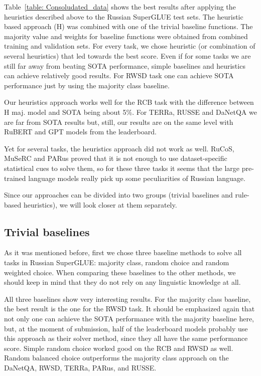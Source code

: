 \documentclass[11pt]{article}
\begin{document}
Table~\ref{table: Consoludated_data} shows the best results after applying the heuristics described above to the Russian SuperGLUE test sets.
The heuristic based approach (H) was combined with one of the trivial baseline functions. The majority value and weights for baseline functions were obtained from combined training and validation sets.
For every task, we chose heuristic (or combination of several heuristics) that led towards the best score. Even if for some tasks we are still far away from beating SOTA performance, simple baselines and heuristics can achieve relatively good results. 
For RWSD task one can achieve SOTA performance just by using the majority class baseline. 


Our heuristics approach works well for the RCB task with the difference between H maj. model and SOTA being about 5\%. For TERRa, RUSSE and DaNetQA we are far from SOTA results but, still, our results are on the same level with RuBERT \cite{kuratov2019adaptation} and GPT models from the leaderboard. 

Yet for several tasks, the heuristics approach did not work as well. RuCoS, MuSeRC and PARus proved that it is not enough to use dataset-specific statistical cues to solve them, so for these three tasks it seems that the large pre-trained language models really pick up some peculiarities of Russian language.

Since our approaches can be divided into two groups (trivial baselines and rule-based heuristics), we will look closer at them separately.

\subsection{Trivial baselines}

As it was mentioned before, first we chose three baseline methods to solve all tasks in Russian SuperGLUE: majority class, random choice and random weighted choice. When comparing these baselines to the other methods, we should keep in mind that they do not rely on any linguistic knowledge at all. 

All three baselines show very interesting results. For the majority class baseline, the best result is the one for the RWSD task. It should be emphasized again that not only one can achieve the SOTA performance with the majority baseline here, but, at the moment of submission, half of the leaderboard models probably use this approach as their solver method, since they all have the same performance score. Simple random choice worked good on the RCB and RWSD as well. Random balanced choice outperforms the majority class approach on the DaNetQA, RWSD, TERRa, PARus, and RUSSE. 
\end{document}
